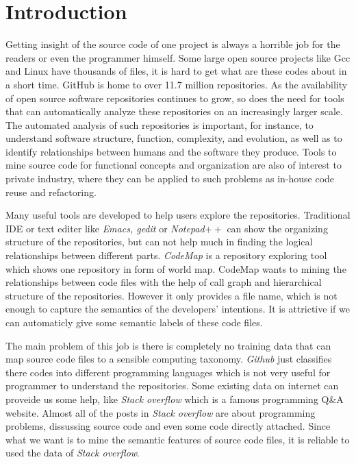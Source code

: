 \section{Introduction}
\label{sec:intro}
Getting insight of the source code of one project is always a horrible job for the 
readers or even the programmer himself. Some large open source projects like Gcc 
and Linux have thousands of files, it is hard to get what are these codes about in a short time.
GitHub\cite{githuburl} is home to over 11.7 million repositories.
As the availability of open source software repositories
continues to grow, so does the need for tools that can automatically analyze 
these repositories on an increasingly larger
scale. The automated analysis of such repositories is important, 
for instance, to understand software structure, function, 
complexity, and evolution, as well as to identify relationships 
between humans and the software they produce.
Tools to mine source code for functional concepts and organization 
are also of interest to private industry, where they
can be applied to such problems as in-house code reuse and
refactoring.

Many useful tools are developed to help users explore the repositories. Traditional
IDE or text editer like {\it Emacs, gedit} or {\it Notepad}$++$ can show the 
organizing structure of the repositories, but can not help much in finding the 
logical relationships between different parts.
{\it CodeMap} is a repository exploring tool which shows one repository in form of 
world map. CodeMap wants to mining the relationships between code files with the
help of call graph and hierarchical structure of the repositories. However
it only provides a file name, which is not enough to capture the semantics of the 
developers' intentions. It is attrictive if we can automaticly give some semantic 
labels of these code files.

The main problem of this job is there is completely no training data that can
map source code files to a sensible computing taxonomy. {\it Github} just classifies
there codes into different programming languages which is not very useful for 
programmer to understand the repositories.
Some existing data on internet can proveide us some help, like {\it Stack overflow} \cite{sofurl}
which is a famous programming Q\&A website. Almost all of the posts in {\it Stack overflow}
are about programming problems, dissussing source code and even some code directly 
attached. Since what we want is to mine the semantic features of source code files,
it is reliable to used the data of {\it Stack overflow}.

